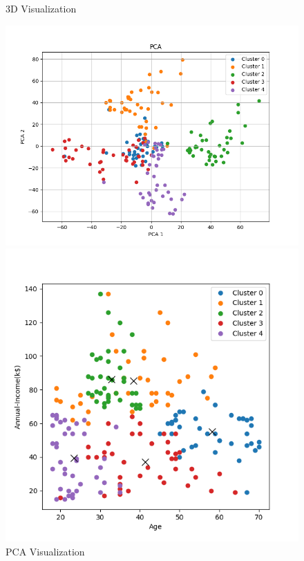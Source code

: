 \documentclass[8pt]{article}
\begin{document}
\begin{figure}[H]
\begin{minipage}{0.32\textwidth}
        \caption{3D Visualization}
        \label{fig: 3D k5 mcom2 con min20}
    \end{minipage}
    \hfill
    \begin{minipage}{0.32\textwidth}
        \centering
        \includegraphics[width=\textwidth]{./Prob4/out/task3_2_mcom2/images/PCA_k5.png}
        \caption{PCA Visualization}
        \label{PCA k5 mcom2 con min20}
    \end{minipage}
    \hfill
    \begin{minipage}{0.32\textwidth}
        \centering
        \includegraphics[width=\textwidth]{./Prob4/out/task3_2_mcom2/images/cluster_result_k5_0_1.png}

\end{minipage}
\end{figure}
\end{document}
